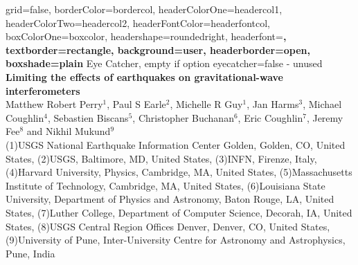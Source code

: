 \documentclass[a0paper,portrait]{baposter}
\begin{document}
\begin{poster}{
	grid=false,
	borderColor=bordercol,
	headerColorOne=headercol1,
	headerColorTwo=headercol2,
	headerFontColor=headerfontcol,
	boxColorOne=boxcolor,
	headershape=roundedright,
	headerfont=\Large\sf\bf,
	textborder=rectangle,
	background=user,
	headerborder=open,
  boxshade=plain
}
{
	Eye Catcher, empty if option eyecatcher=false - unused
}
{   {\LARGE
}
}
{   {\large \bf
	Limiting the effects of earthquakes on gravitational-wave interferometers \\
	}
    {\small
	Matthew Robert Perry$^1$, Paul S Earle$^2$, Michelle R Guy$^1$, Jan Harms$^3$, Michael Coughlin$^4$, Sebastien Biscans$^5$, Christopher Buchanan$^6$, Eric Coughlin$^7$, Jeremy Fee$^8$ and Nikhil Mukund$^9$}\\
	{\tiny (1)USGS National Earthquake Information Center Golden, Golden, CO, United States, (2)USGS, Baltimore, MD, United States, (3)INFN, Firenze, Italy, (4)Harvard University, Physics, Cambridge, MA, United States, (5)Massachusetts Institute of Technology, Cambridge, MA, United States, (6)Louisiana State University, Department of Physics and Astronomy, Baton Rouge, LA, United States, (7)Luther College, Department of Computer Science, Decorah, IA, United States, (8)USGS Central Region Offices Denver, Denver, CO, United States, (9)University of Pune, Inter-University Centre for Astronomy and Astrophysics, Pune, India
}
}
{
\setlength\fboxsep{0pt}
\setlength\fboxrule{0.5pt}
}


\end{poster}
\end{document}
